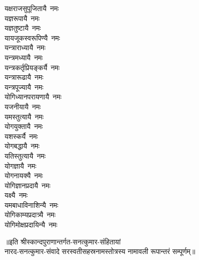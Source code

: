 \begin{flushleft}
\begin{multicols}{2}
यक्षराजसुपूजितायै~नमः\\
यज्ञरूपायै~नमः\\
यज्ञतुष्टायै~नमः\\
यायजूकस्वरूपिण्यै~नमः\\
यन्त्राराध्यायै~नमः\hfill{}\\
यन्त्रमध्यायै~नमः\\
यन्त्रकर्तृप्रियङ्कर्यै~नमः\\
यन्त्रारूढायै~नमः\\
यन्त्रपूज्यायै~नमः\\
योगिध्यानपरायणायै~नमः\\
यजनीयायै~नमः\\
यमस्तुत्यायै~नमः\\
योगयुक्तायै~नमः\\
यशस्कर्यै~नमः\\
योगबद्धायै~नमः\hfill{}\\
यतिस्तुत्यायै~नमः\\
योगज्ञायै~नमः\\
योगनायक्यै~नमः\\
योगिज्ञानप्रदायै~नमः\\
यक्ष्यै~नमः\\
यमबाधाविनाशिन्यै~नमः\\
योगिकाम्यप्रदात्र्यै~नमः\\
योगिमोक्षप्रदायिन्यै~नमः\\
\end{multicols}
\end{flushleft}
॥इति श्रीस्कान्दपुराणान्तर्गत-सनत्कुमार-संहितायां\\नारद-सनत्कुमार-संवादे सरस्वतीसहस्रनामस्तोत्रस्य नामावली रूपान्तरं सम्पूर्णम्॥

